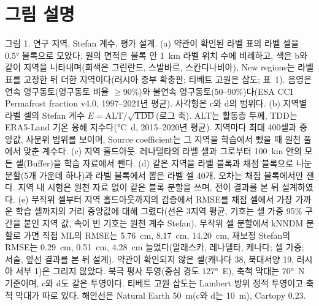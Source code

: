 
\section*{그림 설명}

\noindent 그림 1. 연구 지역, Stefan 계수, 평가 설계.
(a) 약관이 확인된 라벨 표의 라벨 셀을 0.5° 블록으로 모았다. 원의 면적은 블록 안 1~km 라벨 위치 수에 비례하고, 색은 b와 같이 지역을 나타내며(회색은 그린란드, 스발바르, 스칸디나비아), New regions는 라벨 표를 고정한 뒤 더한 지역이다(러시아 중부 확충판; 티베트 고원은 삽도; 표~1).
음영은 연속 영구동토(영구동토 비율 $\geq$90\%)와 불연속 영구동토(50--90\%)다(ESA CCI Permafrost fraction v4.0, 1997--2021년 평균). 사각형은 c와 d의 범위다.
(b) 지역별 라벨 셀의 Stefan 계수 $E = \mathrm{ALT}/\sqrt{\mathrm{TDD}}$(로그 축). ALT는 활동층 두께, TDD는 ERA5-Land\cite{munozsabater2021_era5_land} 기온 융해 지수다(°C~d, 2015--2020년 평균). 지역마다 최대 400셀과 중앙값, 사분위 범위를 보이며, Source coefficient는 그 지역을 학습에서 뺐을 때 원천 풀에서 맞춘 계수다.
(c) 지역 홀드아웃. 레나델타의 라벨 셀과 그로부터 100~km 안의 모든 셀(Buffer)을 학습 자료에서 뺀다.
(d) 같은 지역을 라벨 블록과 채점 블록으로 나눈 분할(5개 가운데 하나)과 라벨 블록에서 뽑은 라벨 셀 40개. 오차는 채점 블록에서만 잰다.
지역 내 시험은 원천 자료 없이 같은 블록 분할을 쓰며, 전이 결과를 본 뒤 설계하였다.
(e) 무작위 셀부터 지역 홀드아웃까지의 검증에서 RMSE를 채점 셀에서 가장 가까운 학습 셀까지의 거리 중앙값에 대해 그렸다(선은 3지역 평균, 기호는 셀 가중 95\% 구간을 붙인 지역 값, 속이 빈 기호는 원천 계수 Stefan).
무작위 셀 분할에서 kNNDM 분할로 가면 직접 ML의 RMSE는 5.76~cm, 8.17~cm, 14.20~cm, 재보정 Stefan의 RMSE는 0.29~cm, 0.51~cm, 4.28~cm 늘었다(알래스카, 레나델타, 캐나다; 셀 가중; 서술, 앞선 결과를 본 뒤 설계).
약관이 확인되지 않은 셀(캐나다 38, 북대서양 19, 러시아 서부 1)은 그리지 않았다.
북극 평사 투영(중심 경도 127°~E), 축척 막대는 70°~N 기준이며, c와 d도 같은 투영이다. 티베트 고원 삽도는 Lambert 방위 정적 투영이고 축척 막대가 따로 있다. 해안선은 Natural Earth 50~m(c와 d는 10~m), Cartopy 0.23.

